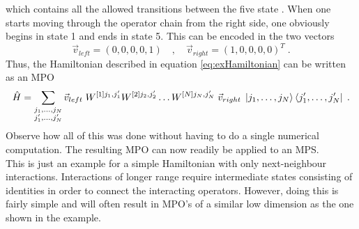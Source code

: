 which contains all the allowed transitions between the five state \cite{Schollwock}. When one starts moving through the operator chain from the right side, one obviously begins in state 1 and ends in state 5. This can be encoded in the two vectors
\begin{equation*}
 \vec{v}_{left} = (0 , 0 , 0 ,0 , 1) \quad , \quad \vec{v}_{right} = (1 , 0 , 0 ,0 , 0)^T \; .
\end{equation*}
Thus, the Hamiltonian described in equation \ref{eq:exHamiltonian} can be written as an MPO 
\begin{equation}
	\hat{H} = \sum_{\substack{j_1 , \ldots , j_N  \\ j_1 ' , \ldots , j_N '}} \vec{v}_{left} \; W^{[1] j_1 , j_1 '} W^{[2] j_2 , j_2 '} \ldots W^{[N] j_N , j_N '} \; \vec{v}_{right} \; \ket{j_1 , \ldots , j_N} \bra{j_1 ' , \ldots , j_N '} \; .
	\label{eq:MPOhamiltonian}
\end{equation}
Observe how all of this was done without having to do a single numerical computation. The resulting MPO can now readily be applied to an MPS.\\

This is just an example for a simple Hamiltonian with only next-neighbour interactions. Interactions of longer range require intermediate states consisting of identities in order to connect the interacting operators. However, doing this is fairly simple and will often result in MPO's of a similar low dimension as the one shown in the example.


